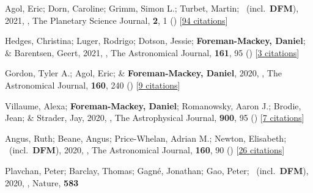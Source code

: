 \item[{\color{numcolor}\scriptsize62}] Agol, Eric; Dorn, Caroline; Grimm, Simon L.; Turbet, Martin; \etal\ (incl.\ \textbf{DFM}), 2021, , The Planetary Science Journal, \textbf{2}, 1 () [\href{https://ui.adsabs.harvard.edu/abs/2021PSJ.....2....1A}{94 citations}]

\item[{\color{numcolor}\scriptsize61}] Hedges, Christina; Luger, Rodrigo; Dotson, Jessie; \textbf{Foreman-Mackey, Daniel}; \& Barentsen, Geert, 2021, , The Astronomical Journal, \textbf{161}, 95 () [\href{https://ui.adsabs.harvard.edu/abs/2021AJ....161...95H}{3 citations}]

\item[{\color{numcolor}\scriptsize60}] Gordon, Tyler A.; Agol, Eric; \& \textbf{Foreman-Mackey, Daniel}, 2020, , The Astronomical Journal, \textbf{160}, 240 () [\href{https://ui.adsabs.harvard.edu/abs/2020AJ....160..240G}{9 citations}]

\item[{\color{numcolor}\scriptsize59}] Villaume, Alexa; \textbf{Foreman-Mackey, Daniel}; Romanowsky, Aaron J.; Brodie, Jean; \& Strader, Jay, 2020, , The Astrophysical Journal, \textbf{900}, 95 () [\href{https://ui.adsabs.harvard.edu/abs/2020ApJ...900...95V}{7 citations}]

\item[{\color{numcolor}\scriptsize58}] Angus, Ruth; Beane, Angus; Price-Whelan, Adrian M.; Newton, Elisabeth; \etal\ (incl.\ \textbf{DFM}), 2020, , The Astronomical Journal, \textbf{160}, 90 () [\href{https://ui.adsabs.harvard.edu/abs/2020AJ....160...90A}{26 citations}]

\item[{\color{numcolor}\scriptsize57}] Plavchan, Peter; Barclay, Thomas; Gagn{\'e}, Jonathan; Gao, Peter; \etal\ (incl.\ \textbf{DFM}), 2020, , Nature, \textbf{583}

